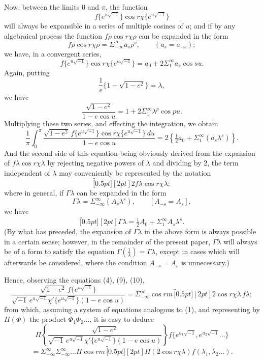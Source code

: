 \documentclass[11pt]{article}
\providecommand{\dd}{\,d}
\providecommand{\br}[1]{\overbracket[0.5pt][2pt]{#1}}
\providecommand{\half}{\tfrac12}
\begin{document}
Now, between the limits $0$ and $\pi$, the function
\[
f\{e^{u\sqrt{-1}}\}\cos r\chi\{e^{u\sqrt{-1}}\}
\]
will always be expansible in a series of multiple cosines of $u$; and if by any
algebraical process the function $f\rho\cos r\chi\rho$ can be expanded in the form
\[
f\rho\cos r\chi\rho=\Sigma_{-\infty}^{\infty}a_{s}\rho^{s},
\qquad (a_s=a_{-s}) \tag{5};
\]
we have, in a convergent series,
\[
f\{e^{u\sqrt{-1}}\}\cos r\chi\{e^{u\sqrt{-1}}\}
=a_{0}+2\Sigma_{1}^{\infty}a_{s}\cos su \tag{6}.
\]
Again, putting
\[
\frac{1}{e}\{1-\sqrt{1-e^{2}}\}=\lambda \tag{7},
\]
we have
\[
\frac{\sqrt{1-e^{2}}}{1-e\cos u}=1+2\Sigma_{1}^{\infty}\lambda^{p}\cos pu \tag{8}.
\]
Multiplying these two series, and effecting the integration, we obtain
\[
\frac{1}{\pi}\int_{0}^{\pi}
\frac{\sqrt{1-e^{2}}\,f\{e^{u\sqrt{-1}}\}\cos r\chi\{e^{u\sqrt{-1}}\}\dd u}
{1-e\cos u}
=2\left\{\half a_{0}+\Sigma_{1}^{\infty}(a_s\lambda^{s})\right\} \tag{9}.
\]
And the second side of this equation being obviously derived from the expansion of
$f\lambda\cos r\chi\lambda$ by rejecting negative powers of $\lambda$ and dividing by
2, the term independent of $\lambda$ may conveniently be represented by the notation
\[
\br{2f\lambda\cos r\chi\lambda} \tag{10};
\]
where in general, if $\Gamma\lambda$ can be expanded in the form
\[
\Gamma\lambda=\Sigma_{-\infty}^{\infty}(A_s\lambda^{s}),\qquad [A_{-s}=A_s] \tag{11},
\]
we have
\[
\br{\Gamma\lambda}=\half A_{0}+\Sigma_{1}^{\infty}A_s\lambda^{s}. \tag{12}
\]
(By what has preceded, the expansion of $\Gamma\lambda$ in the above form is always
possible in a certain sense; however, in the remainder of the present paper,
$\Gamma\lambda$ will always be of a form to satisfy the equation
$\Gamma(\frac{1}{\lambda})=\Gamma\lambda$, except in cases which will afterwards be
considered, where the condition $A_{-s}=A_s$ is unnecessary.)

Hence, observing the equations (4), (9), (10),
\[
\frac{\sqrt{1-e^{2}}\,f\{e^{u\sqrt{-1}}\}}
{\sqrt{-1}\,e^{u\sqrt{-1}}\chi'\{e^{u\sqrt{-1}}\}(1-e\cos u)}
=
\Sigma_{-\infty}^{\infty}\cos rm\,\br{2\cos r\chi\lambda\,f\lambda} \tag{13};
\]
from which, assuming a system of equations analogous to (1), and representing by
$\Pi(\Phi)$ the product $\Phi_{1}\Phi_{2}\ldots$, it is easy to deduce
\[
\Pi\left\{\frac{\sqrt{1-e^{2}}}
{\sqrt{-1}\,e^{u\sqrt{-1}}\chi'\{e^{u\sqrt{-1}}\}(1-e\cos u)}\right\}
f\{e^{u_1\sqrt{-1}},e^{u_2\sqrt{-1}}\ldots\}
\]
\[
=\Sigma_{-\infty}^{\infty}\Sigma_{-\infty}^{\infty}\ldots
\Pi\cos r m\,
\br{\Pi(2\cos r\chi\lambda)f(\lambda_1,\lambda_2\ldots)}. \tag{14}
\]
\end{document}
